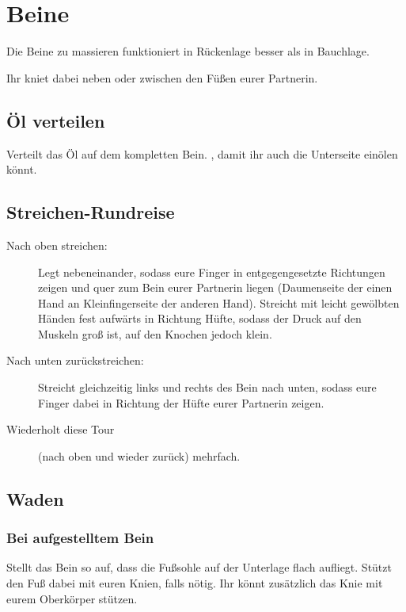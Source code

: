 \section{Beine}

Die Beine zu massieren funktioniert in Rückenlage besser als in Bauchlage.

Ihr kniet dabei neben oder zwischen den Füßen eurer Partnerin.

\subsection{Öl verteilen}
Verteilt das Öl auf dem kompletten Bein. , damit ihr auch die Unterseite einölen könnt.

\subsection{Streichen-Rundreise}
\begin{oframed}
  \begin{description}
    \item [Nach oben streichen:] Legt  nebeneinander, sodass eure Finger in entgegengesetzte Richtungen zeigen und quer zum Bein eurer Partnerin liegen (Daumenseite der einen Hand an Kleinfingerseite der anderen Hand). Streicht mit leicht gewölbten Händen fest aufwärts in Richtung Hüfte, sodass der Druck auf den Muskeln groß ist, auf den Knochen jedoch klein.
    \item [Nach unten zurückstreichen:] Streicht gleichzeitig links und rechts des Bein nach unten, sodass eure Finger dabei in Richtung der Hüfte eurer Partnerin zeigen.
    \item [Wiederholt diese Tour] (nach oben und wieder zurück) mehrfach.
  \end{description}
\end{oframed}

\subsection{Waden}

\subsubsection{Bei aufgestelltem Bein}

Stellt das Bein so auf, dass die Fußsohle auf der Unterlage flach aufliegt. Stützt den Fuß dabei mit euren Knien, falls nötig. Ihr könnt zusätzlich das Knie mit eurem Oberkörper stützen.

